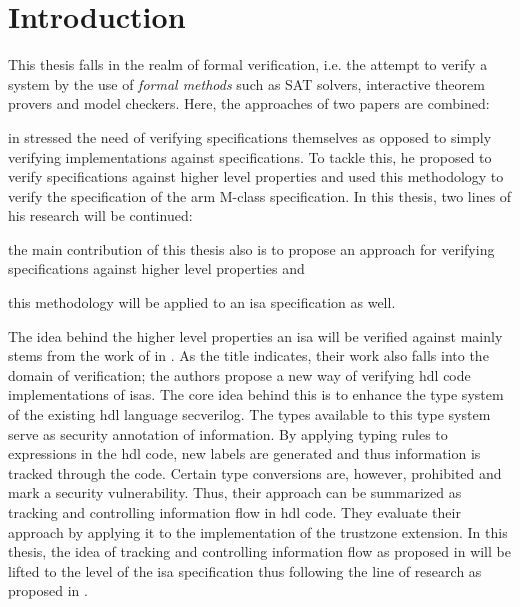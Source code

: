 
\section{Introduction}
\label{sec:introduction}

This thesis falls in the realm of formal verification, i.e. the attempt to verify a system by the use of \textit{formal methods} such as SAT solvers, interactive theorem provers and model checkers.
Here, the approaches of two papers are combined:

\citeauthor{Reid17} in  \cite{Reid17} stressed the need of verifying specifications themselves as opposed to simply verifying implementations against specifications.
To tackle this, he proposed to verify specifications against higher level properties and used this methodology to verify the specification of the \gls{arm} M-class specification.
In this thesis, two lines of his research will be continued: \begin{enumerate*}[label=\alph*)]
    \item the main contribution of this thesis also is to propose an approach for verifying specifications against higher level properties and
    \item this methodology will be applied to an \gls{isa} specification as well.
\end{enumerate*}

The idea behind the higher level properties an \gls{isa} will be verified against mainly stems from the work of \citeauthor{Ferraiuolo17} in  \cite{Ferraiuolo17}.
As the title indicates, their work also falls into the domain of verification; the authors propose a new way of verifying \gls{hdl} code implementations of \glspl{isa}.
The core idea behind this is to enhance the type system of the existing \gls{hdl} language \gls{secverilog}.
The types available to this type system serve as security annotation of information.
By applying typing rules to expressions in the \gls{hdl} code, new labels are generated and thus information is tracked through the code.
Certain type conversions are, however, prohibited and mark a security vulnerability.
Thus, their approach can be summarized as tracking and controlling information flow in \gls{hdl} code.
They evaluate their approach by applying it to the implementation of the \gls{trustzone} extension.
In this thesis, the idea of tracking and controlling information flow as proposed in \cite{Ferraiuolo17} will be lifted to the level of the \gls{isa} specification thus following the line of research as proposed in \cite{Reid17}.

